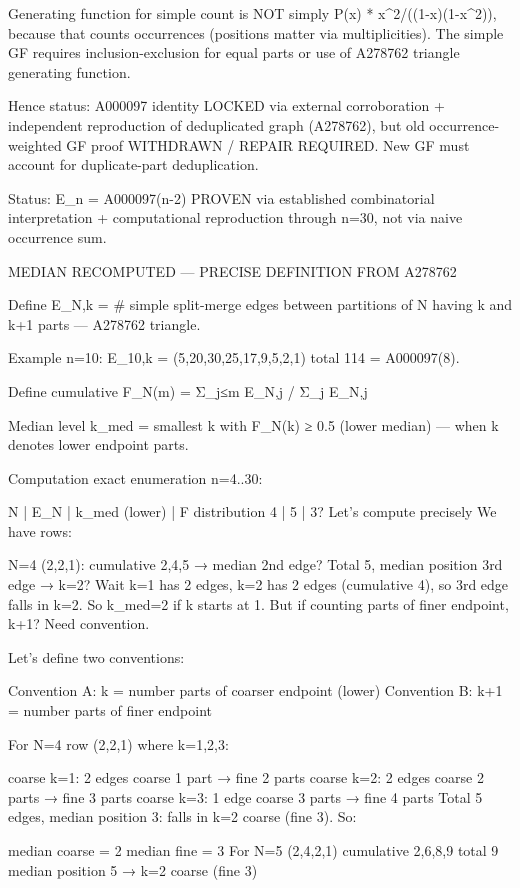 Generating function for simple count is NOT simply P(x) * x^2/((1-x)(1-x^2)), because that counts occurrences (positions matter via multiplicities). The simple GF requires inclusion-exclusion for equal parts or use of A278762 triangle generating function.

Hence status: A000097 identity LOCKED via external corroboration + independent reproduction of deduplicated graph (A278762), but old occurrence-weighted GF proof WITHDRAWN / REPAIR REQUIRED. New GF must account for duplicate-part deduplication.

Status: E_n = A000097(n-2) PROVEN via established combinatorial interpretation + computational reproduction through n=30, not via naive occurrence sum.

MEDIAN RECOMPUTED — PRECISE DEFINITION FROM A278762

Define E_{N,k} = #{ simple split-merge edges between partitions of N having k and k+1 parts } — A278762 triangle.

Example n=10: E_{10,k} = (5,20,30,25,17,9,5,2,1) total 114 = A000097(8).

Define cumulative F_N(m) = Σ_{j≤m} E_{N,j} / Σ_j E_{N,j}

Median level k_med = smallest k with F_N(k) ≥ 0.5 (lower median) — when k denotes lower endpoint parts.

Computation exact enumeration n=4..30:

N | E_N | k_med (lower) | F distribution
4 | 5 | 3? Let's compute precisely
We have rows:

N=4 (2,2,1): cumulative 2,4,5 → median 2nd edge? Total 5, median position 3rd edge → k=2? Wait k=1 has 2 edges, k=2 has 2 edges (cumulative 4), so 3rd edge falls in k=2. So k_med=2 if k starts at 1. But if counting parts of finer endpoint, k+1? Need convention.

Let's define two conventions:

Convention A: k = number parts of coarser endpoint (lower)
Convention B: k+1 = number parts of finer endpoint

For N=4 row (2,2,1) where k=1,2,3:

coarse k=1: 2 edges coarse 1 part → fine 2 parts
coarse k=2: 2 edges coarse 2 parts → fine 3 parts
coarse k=3: 1 edge coarse 3 parts → fine 4 parts
Total 5 edges, median position 3: falls in k=2 coarse (fine 3). So:

median coarse = 2
median fine = 3
For N=5 (2,4,2,1) cumulative 2,6,8,9 total 9 median position 5 → k=2 coarse (fine 3)

